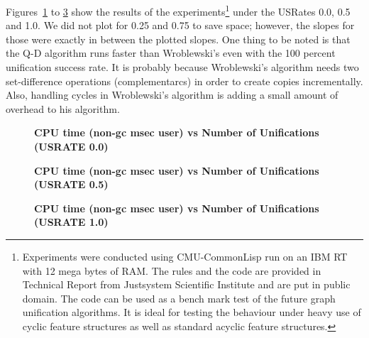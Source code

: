 Figures~\ref{figure19} to \ref{figure21} show the results of the 
experiments\footnote{Experiments were conducted using
CMU-CommonLisp run on an IBM RT with 12 mega bytes of RAM.
The rules and the code are provided in Technical Report from
Justsystem Scientific Institute and are put in public domain. The code
can be used as a bench mark test of 
the future graph unification algorithms. It is ideal for
testing the behaviour under heavy use of cyclic feature
structures as well as standard acyclic feature structures.}
under the USRates 0.0, 0.5 and 1.0. We did not plot for 
0.25 and 0.75 to save space; however, the slopes for those were 
exactly in between the plotted slopes. One thing to be noted
is that the Q-D algorithm runs faster than Wroblewski's even
with the 100 percent unification success rate. It is
probably because Wroblewski's algorithm needs two
set-difference operations (complementarcs) in order to
create copies incrementally. Also, handling cycles in
Wroblewski's algorithm is adding a small amount of
overhead to his algorithm. 

\begin{figure}[htb]
\epsfxsize 140mm
\epsfysize 200mm
\vspace*{6cm}
\hspace*{5cm}
\vspace*{5.5cm}
\caption{{\bf CPU time (non-gc msec user) vs Number of Unifications
(USRATE 0.0)}}
\label{figure19}
\end{figure}




\begin{figure}[htb]
\epsfxsize 140mm
\epsfysize 200mm
\vspace*{6cm}
\hspace*{5cm}
\vspace*{5.5cm}
\caption{{\bf CPU time (non-gc msec user) vs Number of Unifications
(USRATE 0.5)}}
\label{figure20}
\end{figure}





\begin{figure}[htb]
\epsfxsize 140mm
\epsfysize 200mm
\vspace*{6cm}
\hspace*{5cm}
\vspace*{5.5cm}
\caption{{\bf CPU time (non-gc msec user) vs Number of Unifications
(USRATE 1.0)}}
\label{figure21}
\end{figure}


